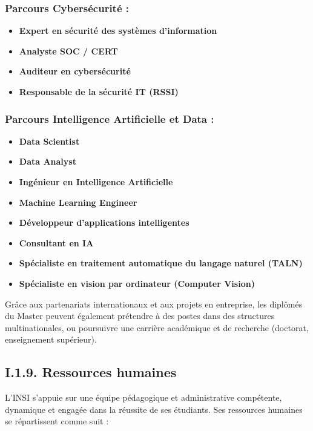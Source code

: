 \subsubsection*{Parcours Cybersécurité :}
\begin{itemize}
    \item \textbf{Expert en sécurité des systèmes d'information}
    \item \textbf{Analyste SOC / CERT}
    \item \textbf{Auditeur en cybersécurité}
    \item \textbf{Responsable de la sécurité IT (RSSI)}
\end{itemize}

\subsubsection*{Parcours Intelligence Artificielle et Data :}
\begin{itemize}
    \item \textbf{Data Scientist}
    \item \textbf{Data Analyst}
    \item \textbf{Ingénieur en Intelligence Artificielle}
    \item \textbf{Machine Learning Engineer}
\end{itemize}

\begin{itemize}
    \item \textbf{Développeur d'applications intelligentes}
    \item \textbf{Consultant en IA}
    \item \textbf{Spécialiste en traitement automatique du langage naturel (TALN)}
    \item \textbf{Spécialiste en vision par ordinateur (Computer Vision)}
\end{itemize}

Grâce aux partenariats internationaux et aux projets en entreprise, les diplômés du Master peuvent également prétendre à des postes dans des structures multinationales, ou poursuivre une carrière académique et de recherche (doctorat, enseignement supérieur).

\subsection{I.1.9. Ressources humaines}

L'INSI s'appuie sur une équipe pédagogique et administrative compétente, dynamique et engagée dans la réussite de ses étudiants. Ses ressources humaines se répartissent comme suit :

